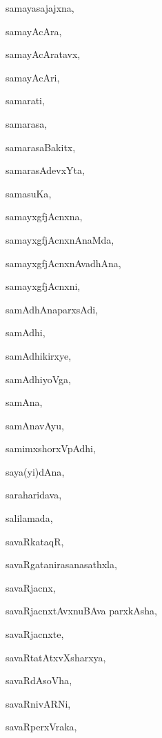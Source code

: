 \begin{multicols}{2}
{samayasajajxna}, \pageref{samayasajajxna}

{samayAcAra}, \pageref{samayAcAra}

{samayAcAratavx}, \pageref{samayAcAratavx}

{samayAcAri}, \pageref{samayAcAri}

{samarati}, \pageref{samarati}

{samarasa}, \pageref{samarasa}

{samarasaBakitx}, \pageref{samarasaBakitx}

{samarasAdevxYta}, \pageref{samarasAdevxYta}

{samasuKa}, \pageref{samasuKa}

{samayxgfjAcnxna}, \pageref{samayxgfjAcnxna}

{samayxgfjAcnxnAnaMda}, \pageref{samayxgfjAcnxnAnaMda}

{samayxgfjAcnxnAvadhAna}, \pageref{samayxgfjAcnxnAvadhAna}

{samayxgfjAcnxni}, \pageref{samayxgfjAcnxni}

{samAdhAnaparxsAdi}, \pageref{samAdhAnaparxsAdi}

{samAdhi}, \pageref{samAdhi}

{samAdhikirxye}, \pageref{samAdhikirxye}

{samAdhiyoVga}, \pageref{samAdhiyoVga}

{samAna}, \pageref{samAna}

{samAnavAyu}, \pageref{samAnavAyu}

{samimxshorxVpAdhi}, \pageref{samimxshorxVpAdhi}

{saya(yi)dAna}, \pageref{sayayidAna}

{saraharidava}, \pageref{saraharidava}

{salilamada}, \pageref{salilamada}

{savaRkataqR}, \pageref{savaRkataqR}

{savaRgatanirasanasathxla}, \pageref{savaRgatanirasanasathxla}

{savaRjacnx}, \pageref{savaRjacnx}

{savaRjacnxtAvxnuBAva parxkAsha}, \pageref{savaRjacnxtAvxnuBAvaparxkAsha}

{savaRjacnxte}, \pageref{savaRjacnxte}

{savaRtatAtxvXsharxya}, \pageref{savaRtatAtxvXsharxya}

{savaRdAsoVha}, \pageref{savaRdAsoVha}

{savaRnivARNi}, \pageref{savaRnivARNi}

{savaRperxVraka}, \pageref{savaRperxVraka}


\end{multicols}
